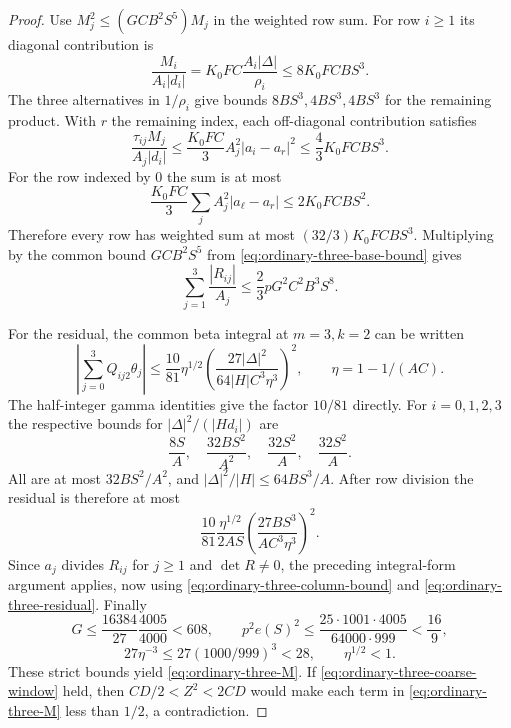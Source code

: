 \documentclass[12pt]{article}
\numberwithin{equation}{section}
\begin{document}
\begin{proof}
Use $M_j^2\le(GCB^2S^5)M_j$ in the weighted row sum.  For row $i\ge1$ its
diagonal contribution is
\[
 \frac{M_i}{A_i|d_i|}
 =K_0FC\frac{A_i|\Delta|}{\rho_i}\le8K_0FCBS^3.
\]
The three alternatives in $1/\rho_i$ give bounds $8BS^3,4BS^3,4BS^3$
for the remaining product.  With $r$ the remaining index, each
off-diagonal contribution satisfies
\[
 \frac{\tau_{ij}M_j}{A_j|d_i|}
 \le\frac{K_0FC}{3}A_j^2|a_i-a_r|^2
 \le\frac43K_0FCBS^3.
\]
For the row indexed by $0$ the sum is at most
\[
 \frac{K_0FC}{3}\sum_j A_j^2|a_\ell-a_r|
 \le2K_0FCBS^2.
\]
Therefore every row has weighted sum at most
$(32/3)K_0FCBS^3$.  Multiplying by the common bound $GCB^2S^5$ from \eqref{eq:ordinary-three-base-bound} gives
\begin{equation}\label{eq:ordinary-three-column-bound}
 \sum_{j=1}^3\frac{|R_{ij}|}{A_j}
 \le\frac23pG^2C^2B^3S^8.
\end{equation}

For the residual, the common beta integral at $m=3,k=2$ can be written
\[
 \left|\sum_{j=0}^3Q_{ij2}\theta_j\right|
 \le\frac{10}{81}\eta^{1/2}
       \left(\frac{27|\Delta|^2}{64|H|C^3\eta^3}\right)^2,
 \qquad\eta=1-1/(AC).
\]
The half-integer gamma identities give the factor $10/81$ directly.
For $i=0,1,2,3$ the respective bounds for
$|\Delta|^2/(|H d_i|)$ are
\[
 \frac{8S}{A},\quad\frac{32BS^2}{A^2},\quad
 \frac{32S^2}{A},\quad\frac{32S^2}{A}.
\]
All are at most $32BS^2/A^2$, and
$|\Delta|^2/|H|\le64BS^3/A$.  After row division the residual is
therefore at most
\begin{equation}\label{eq:ordinary-three-residual}
 \frac{10}{81}\frac{\eta^{1/2}}{2AS}
       \left(\frac{27BS^3}{AC^3\eta^3}\right)^2.
\end{equation}
Since $a_j$ divides $R_{ij}$ for $j\ge1$ and $\det R\ne0$, the preceding integral-form argument applies, now using
\eqref{eq:ordinary-three-column-bound} and
\eqref{eq:ordinary-three-residual}.  Finally
\[
 G\le\frac{16384}{27}\frac{4005}{4000}<608,
 \qquad
 p^2e(S)^2\le
 \frac{25\cdot1001\cdot4005}{64000\cdot999}<\frac{16}{9},
\]
\[
 27\eta^{-3}\le27(1000/999)^3<28,
 \qquad\eta^{1/2}<1.
\]
These strict bounds yield \eqref{eq:ordinary-three-M}.
If \eqref{eq:ordinary-three-coarse-window} held, then
$CD/2<Z^2<2CD$ would make each term in
\eqref{eq:ordinary-three-M} less than $1/2$, a contradiction.
\end{proof}

\end{document}
